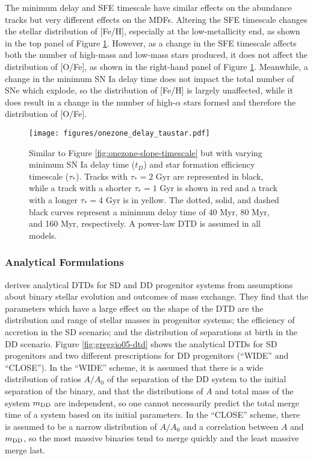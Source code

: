 \documentclass[twocolumn]{aastex631}
\begin{document}
The minimum delay and SFE timescale have similar effects on the abundance tracks but very different effects on the MDFs. Altering the SFE timescale changes the stellar distribution of [Fe/H], especially at the low-metallicity end, as shown in the top panel of Figure \ref{fig:onezone-delay-taustar}. However, as a change in the SFE timescale affects both the number of high-mass and low-mass stars produced, it does not affect the distribution of [O/Fe], as shown in the right-hand panel of Figure \ref{fig:onezone-delay-taustar}. Meanwhile, a change in the minimum SN Ia delay time does not impact the total number of SNe which explode, so the distribution of [Fe/H] is largely unaffected, while it does result in a change in the number of high-$\alpha$ stars formed and therefore the distribution of [O/Fe].

\begin{figure}
    \centering
    \texttt{[image: figures/onezone\_delay\_taustar.pdf]}
    \caption{Similar to Figure \ref{fig:onezone-slope-timescale} but with varying minimum SN Ia delay time ($t_D$) and star formation efficiency timescale ($\tau_*$). Tracks with $\tau_*=2$ Gyr are represented in black, while a track with a shorter $\tau_*=1$ Gyr is shown in red and a track with a longer $\tau_*=4$ Gyr is in yellow. The dotted, solid, and dashed black curves represent a minimum delay time of 40 Myr, 80 Myr, and 160 Myr, respectively. A power-law DTD is assumed in all models.}
    \label{fig:onezone-delay-taustar}
\end{figure}

\subsubsection{Analytical Formulations}

\citet{Greggio2005-AnalyticalRates} derives analytical DTDs for SD and DD progenitor systems from assumptions about binary stellar evolution and outcomes of mass exchange. They find that the parameters which have a large effect on the shape of the DTD are the distribution and range of stellar masses in progenitor systems; the efficiency of accretion in the SD scenario; and the distribution of separations at birth in the DD scenario. Figure \ref{fig:greggio05-dtd} shows the analytical DTDs for SD progenitors and two different prescriptions for DD progenitors (``WIDE'' and ``CLOSE''). In the ``WIDE'' scheme, it is assumed that there is a wide distribution of ratios $A/A_0$ of the separation of the DD system to the initial separation of the binary, and that the distributions of $A$ and total mass of the system $m_{\rm{DD}}$ are independent, so one cannot necessarily predict the total merge time of a system based on its initial parameters. In the ``CLOSE'' scheme, there is assumed to be a narrow distribution of $A/A_0$ and a correlation between $A$ and $m_{\rm{DD}}$, so the most massive binaries tend to merge quickly and the least massive merge last.
\end{document}
